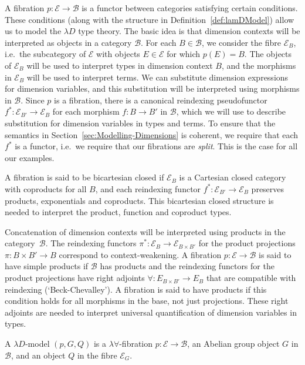 \documentclass[a4paper,UKenglish]{lipics}
\theoremstyle{plain}
\newcommand{\B}{\mathcal{B}}
\newcommand{\E}{\mathcal{E}}
\newcommand{\fibreE}[1]{\E_{#1}}
\begin{document}
A fibration $p:\E\to\B$ is a functor between categories satisfying certain conditions. These conditions (along with the structure in Definition~\ref{def:lamDModel}) allow us to model the $\lambda D$ type theory. The basic idea is that dimension contexts will be interpreted as objects in a category $\B$. For each $B\in\B$, we consider the fibre $\E_B$, i.e.\ the subcategory of $\E$ with objects $E \in \E$ for which $p(E)=B$. The objects of $\E_B$ will be used to interpret types in dimension context $B$, and the morphisms in $\E_B$ will be used to interpret terms. We can substitute dimension expressions for dimension variables, and this substitution will be interpreted using morphisms in $\B$.  Since $p$ is a fibration, there is a canonical reindexing pseudofunctor $f^\ast : \E_{B'}\to \E_B$ for each morphism $f:B\to B'$ in $\B$, which we will use to describe substitution for dimension variables in types and terms. To ensure that the semantics in Section~\ref{sec:Modelling-Dimensions} is coherent, we require that each $f^\ast$ is a functor,  i.e.\ we require that our fibrations are \emph{split}. This is the case for all our examples.

A fibration is said to be bicartesian closed if $\E_B$ is a Cartesian closed category with coproducts for all $B$, and each reindexing functor $f^*:\E_{B'}\to\E_B$ preserves products, exponentials and coproducts. This bicartesian closed structure is needed to interpret the product, function and coproduct types.

Concatenation of dimension contexts will be interpreted using products in the category~$\B$. The reindexing functors  $\pi^\ast:\E_{B}\to \E_{B\times B'}$ for the product projections $\pi:B\times B'\to B$ correspond to context-weakening. A fibration $p:\E\to \B$ is said to have simple products if $\B$ has products and the reindexing functors for the product projections have right adjoints $\forall:E_{B\times B'}\to E_B$ that are compatible with reindexing (`Beck-Chevalley'). A fibration is said to have products if this condition holds for all morphisms in the base, not just projections. These right adjoints are needed to interpret universal quantification of dimension variables in types.

\begin{definition}\label{def:lamDModel}
A $\lambda D$-model $(p,G, Q)$ is a $\lambda \forall$-fibration $p:\E\to \B$, an Abelian group object $G$ in $\B$, and an object $Q$ in the fibre $\fibreE{G}$.
\end{definition}
\end{document}
